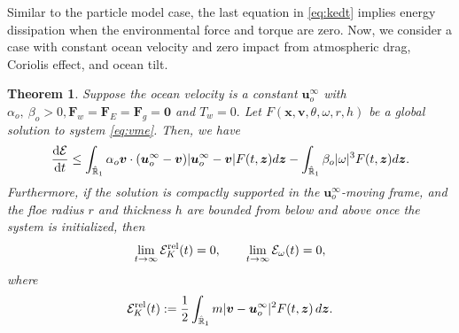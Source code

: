 \documentclass[a4paper,11pt]{article}
\numberwithin{equation}{section}
\newtheorem{theorem}{Theorem}[section]
\theoremstyle{definition}
\newcommand{\bfx}{\boldsymbol{x}}
\newcommand{\bfz}{\boldsymbol{z}}
\newcommand{\bfzr}{\boldsymbol{0}}
\newcommand{\bfv}{\boldsymbol{v}}
\newcommand{\bfu}{\boldsymbol{u}_o}
\newcommand{\bfuu}{\boldsymbol{u}}
\newcommand{\bfF}{\boldsymbol{F}}
\newcommand{\bbr}{\mathbb R}
\def\d{{  \rm d}}
\newcommand{\E}{\mathcal{E}}
\begin{document}
Similar to the particle model case, the last equation in \eqref{eq:kedt} implies energy dissipation when the environmental force and torque are zero. Now, we consider a case with constant ocean velocity and zero impact from atmospheric drag, Coriolis effect, and ocean tilt.

\begin{theorem} \label{thm:vw=0}
Suppose the ocean velocity is a constant $\bfu^\infty$ with 
$\alpha_o,\ \beta_o>0, \bfF_w=\bfF_E=\bfF_g=\bfzr$ and $T_w=0.$
Let $F(\bfx, \bfv, \theta, \omega, r,h)$ be a global solution to system \eqref{eq:vme}.
Then, we have
\[
\frac{\d \E}{\d t}\le \int_{\hat{\bbr}_1}\alpha_o \bfv\cdot(\bfu^\infty-\bfv)|\bfu^{\infty}-\bfv| F(t,\bfz)d\bfz-\int_{\hat{\bbr}_1}\beta_o |\omega|^3 F(t,\bfz)d\bfz.
\]
Furthermore, if the solution is compactly supported in the $\bfuu_o^\infty$-moving frame, and
the floe radius $r$ and thickness $h$ are bounded from below and above once the
system is initialized, then
\[
\lim_{t\to \infty}\E_K^{\rm rel}(t)=0,
\qquad
\lim_{t\to \infty}\E_\omega(t)=0,
\]
where
\[
\E_K^{\rm rel}(t)
:=
\frac12
\int_{\hat{\bbr}_1}
m|\bfv-\bfu^\infty|^2F(t,\bfz)\,d\bfz .
\]
\end{theorem}
\end{document}
